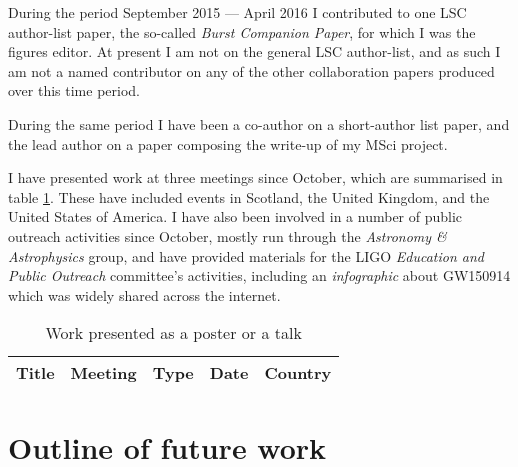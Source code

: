 \documentclass{kentigern}
\begin{document}
During the period September 2015 --- April 2016 I contributed to one
LSC author-list paper, the so-called \emph{Burst Companion Paper}, for
which I was the figures editor. At present I am not on the general LSC
author-list, and as such I am not a named contributor on any of the
other collaboration papers produced over this time period.

During the same period I have been a co-author on a short-author list
paper, and the lead author on a paper composing the write-up of my
MSci project.

I have presented work at three meetings since October, which are
summarised in table \ref{tab:presentations}. These have included
events in Scotland, the United Kingdom, and the United States of
America. I have also been involved in a number of public outreach
activities since October, mostly run through the \emph{Astronomy \&
  Astrophysics} group, and have provided materials for the LIGO
\emph{Education and Public Outreach} committee's activities, including
an \emph{infographic} about GW150914 which was widely shared across
the internet.

\begin{table}
  \centering
  \begin{tabular}[b]{llcll}
    Title & Meeting & Type & Date & Country \\ \hline
    
  \end{tabular}
  \caption{Work presented as a poster or a talk}
  \label{tab:presentations}
\end{table}

\part{Outline of future work}
\label{part:future}






\glsaddall
\printglossaries
\end{document}
